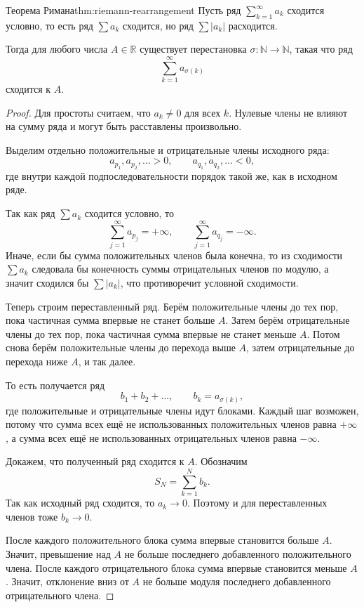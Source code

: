 \begin{Theorem}{Теорема Римана}{thm:riemann-rearrangement}
	Пусть ряд \(\sum_{k=1}^{\infty} a_k\) сходится условно, то есть ряд \(\sum a_k\) сходится, но ряд \(\sum |a_k|\) расходится.
	
	Тогда для любого числа \(A\in\mathbb R\) существует перестановка \(\sigma:\mathbb N\to\mathbb N\), такая что ряд
	\[
	\sum_{k=1}^{\infty} a_{\sigma(k)}
	\]
	сходится к \(A\).
\end{Theorem}

\begin{proof}
	Для простоты считаем, что \(a_k\ne 0\) для всех \(k\). Нулевые члены не влияют на сумму ряда и могут быть расставлены произвольно.
	
	Выделим отдельно положительные и отрицательные члены исходного ряда:
	\[
	a_{p_1},a_{p_2},\dots >0,
	\qquad
	a_{q_1},a_{q_2},\dots <0,
	\]
	где внутри каждой подпоследовательности порядок такой же, как в исходном ряде.
	
	Так как ряд \(\sum a_k\) сходится условно, то
	\[
	\sum_{j=1}^{\infty} a_{p_j}=+\infty,
	\qquad
	\sum_{j=1}^{\infty} a_{q_j}=-\infty.
	\]
	Иначе, если бы сумма положительных членов была конечна, то из сходимости \(\sum a_k\) следовала бы конечность суммы отрицательных членов по модулю, а значит сходился бы \(\sum |a_k|\), что противоречит условной сходимости.
	
	Теперь строим переставленный ряд. Берём положительные члены до тех пор, пока частичная сумма впервые не станет больше \(A\). Затем берём отрицательные члены до тех пор, пока частичная сумма впервые не станет меньше \(A\). Потом снова берём положительные члены до перехода выше \(A\), затем отрицательные до перехода ниже \(A\), и так далее.
	
	То есть получается ряд
	\[
	b_1+b_2+\dots,
	\qquad
	b_k=a_{\sigma(k)},
	\]
	где положительные и отрицательные члены идут блоками. Каждый шаг возможен, потому что сумма всех ещё не использованных положительных членов равна \(+\infty\), а сумма всех ещё не использованных отрицательных членов равна \(-\infty\).
	
	Докажем, что полученный ряд сходится к \(A\). Обозначим
	\[
	S_N=\sum_{k=1}^{N}b_k.
	\]
	Так как исходный ряд сходится, то \(a_k\to 0\). Поэтому и для переставленных членов тоже \(b_k\to 0\).
	
	После каждого положительного блока сумма впервые становится больше \(A\). Значит, превышение над \(A\) не больше последнего добавленного положительного члена. После каждого отрицательного блока сумма впервые становится меньше \(A\). Значит, отклонение вниз от \(A\) не больше модуля последнего добавленного отрицательного члена.
	

\end{proof}
